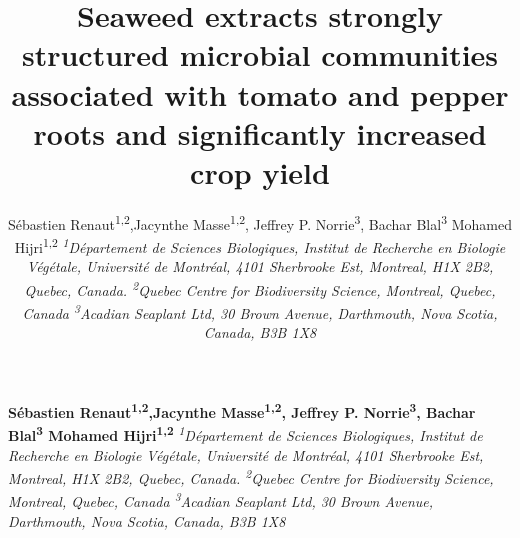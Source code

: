 \documentclass[12pt,]{article}
\title{\textbf{Seaweed extracts strongly structured microbial communities
associated with tomato and pepper roots and significantly increased crop
yield}  }
\author{\Large Sébastien Renaut\textsuperscript{1,2},Jacynthe
Masse\textsuperscript{1,2}, Jeffrey P. Norrie\textsuperscript{3}, Bachar
Blal\textsuperscript{3} Mohamed Hijri\textsuperscript{1,2}\vspace{0.05in} \newline\normalsize\emph{\textsuperscript{1}Département de Sciences Biologiques, Institut de
Recherche en Biologie Végétale, Université de Montréal, 4101 Sherbrooke
Est, Montreal, H1X 2B2, Quebec, Canada. \textsuperscript{2}Quebec Centre
for Biodiversity Science, Montreal, Quebec, Canada
\textsuperscript{3}Acadian Seaplant Ltd, 30 Brown Avenue, Darthmouth,
Nova Scotia, Canada, B3B 1X8}  }
\date{}
\newcommand*{\authorfont}{\fontfamily{phv}\selectfont}
\begin{document}
	
%

{%
\setlength{\parindent}{0pt}
\thispagestyle{plain}
{\fontsize{18}{20}\selectfont\raggedright 
\maketitle  %

}

{
   \vskip 13.5pt\relax \normalsize\fontsize{11}{12} 
\textbf{\authorfont Sébastien Renaut\textsuperscript{1,2},Jacynthe
Masse\textsuperscript{1,2}, Jeffrey P. Norrie\textsuperscript{3}, Bachar
Blal\textsuperscript{3} Mohamed Hijri\textsuperscript{1,2}} \hskip 15pt \emph{\small \textsuperscript{1}Département de Sciences Biologiques, Institut de
Recherche en Biologie Végétale, Université de Montréal, 4101 Sherbrooke
Est, Montreal, H1X 2B2, Quebec, Canada. \textsuperscript{2}Quebec Centre
for Biodiversity Science, Montreal, Quebec, Canada
\textsuperscript{3}Acadian Seaplant Ltd, 30 Brown Avenue, Darthmouth,
Nova Scotia, Canada, B3B 1X8}   

}

}
\end{document}
